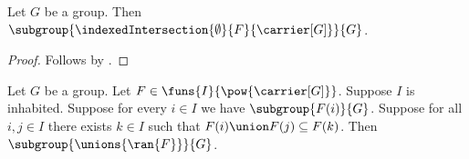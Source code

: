 \begin{corollary}\label{empty_indexed_intersection_subgroup}
    Let $G$ be a group.
    Then
        $\subgroup{
            \indexedIntersection{\emptyset}{F}{\carrier[G]}}{G}$.
\end{corollary}
\begin{proof}
    Follows by
        .
\end{proof}

\begin{theorem}\label{directed_subgroup_union}
    Let $G$ be a group.
    Let $F\in\funs{I}{\pow{\carrier[G]}}$.
    Suppose $I$ is inhabited.
    Suppose for every $i\in I$ we have $\subgroup{F(i)}{G}$.
    Suppose for all $i,j\in I$ there exists $k\in I$ such that
        $F(i)\union F(j)\subseteq F(k)$.
    Then $\subgroup{\unions{\ran{F}}}{G}$.
\end{theorem}
